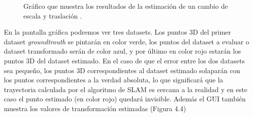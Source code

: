 \begin{figure}[H]
\begin{center}
\hspace{0.5cm}

\end{center}

\caption{Gráfico que muestra los resultados de la estimación de un cambio de escala y traslación .}
\end{figure}

En la pantalla gráfica podremos ver tres datasets. Los puntos 3D del primer dataset \textit{groundtrouth} se pintarán en color verde, los puntos del dataset a evaluar o dataset transformado serán de color azul, y por último en color rojo estarán los puntos 3D del dataset estimado.
En el caso de que el error entre los dos datasets sea pequeño, los puntos 3D correspondientes al dataset estimado solaparán con los puntos correspondientes a la verdad absoluta, lo que significará que la trayectoria calculada por el algoritmo de SLAM es cercana a la realidad y en este caso el punto estimado (en color rojo) quedará invisible. Además el GUI también muestra los valores de transformación estimadas (Figura 4.4)


\clearpage

